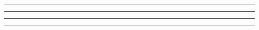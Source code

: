 
\begin{problem}{7.4}

\end{problem}

\begin{solution}


\end{solution}

\noindent\rule{7in}{1.5pt}


\begin{problem}{7.5}

\end{problem}

\begin{solution}


\end{solution}

\noindent\rule{7in}{1.5pt}


\begin{problem}{7.6}

\end{problem}

\begin{solution}


\end{solution}

\noindent\rule{7in}{1.5pt}


\begin{problem}{7.7}

\end{problem}

\begin{solution}


\end{solution}

\noindent\rule{7in}{1.5pt}

